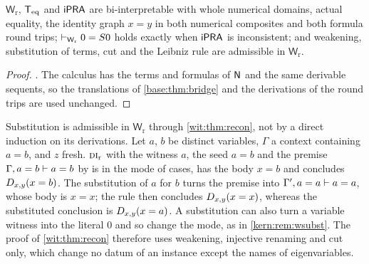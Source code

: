 \begin{corollary}
\label{wit:cor:recon-bridge}
$\mathsf{W}_{\mathrm r}$, $\mathsf{T}_{\mathrm{eq}}$ and $\mathsf{iPRA}$ are bi-interpretable with whole
numerical domains, actual equality, the identity graph $x=y$ in both numerical
composites and both formula round trips;
$\vdash_{\mathsf{W}_{\mathrm r}}0=S 0$ holds exactly when $\mathsf{iPRA}$ is
inconsistent; and weakening, substitution of terms, cut and the Leibniz rule
are admissible in $\mathsf{W}_{\mathrm r}$.
\end{corollary}

\begin{proof}
.  The calculus has the terms and
formulas of $\mathsf{N}$ and the same derivable sequents, so the translations of
\cref{base:thm:bridge} and the derivations of the round trips are used
unchanged.
\end{proof}

\begin{remark}
\label{wit:rem:recon-subst}
Substitution is admissible in $\mathsf{W}_{\mathrm r}$ through
\cref{wit:thm:recon}, not by a direct induction on its derivations.  Let $a$,
$b$ be distinct variables, $\Gamma$ a context containing $a=b$, and $z$ fresh.
$\rulename{DI}_{\mathrm{r}}$ with the witness $a$, the seed $a=b$ and the
premise $\Gamma,a=b\vdash a=b$ by  is in the mode of cases, has
the body $x=b$ and concludes $D_{x,y}(x=b)$.  The substitution of $a$ for
$b$ turns the premise into $\Gamma',a=a\vdash a=a$, whose body is $x=x$; the
rule then concludes $D_{x,y}(x=x)$, whereas the substituted conclusion is
$D_{x,y}(x=a)$.  A substitution can also turn a variable witness into the
literal $0$ and so change the mode, as in \cref{kern:rem:wsubst}.  The proof
of \cref{wit:thm:recon} therefore uses weakening, injective renaming and cut
only, which change no datum of an instance except the names of
eigenvariables.
\end{remark}

